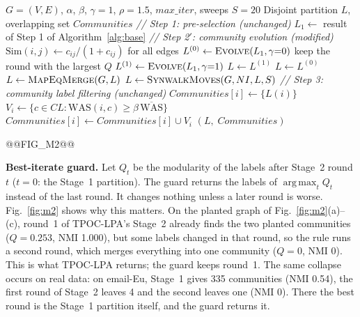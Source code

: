 \documentclass[conference]{IEEEtran}
\newcommand{\algcomment}[1]{\Statex \textit{// #1}}
\DeclareMathOperator*{\argmax}{arg\,max}
\begin{document}
\begin{algorithm}[t]
\footnotesize
\caption{Proposed pipeline (SN-LPA)}\label{alg:ours}
\begin{algorithmic}[1]
\Require $G=(V,E)$, $\alpha$, $\beta$, $\gamma{=}1$, $\rho{=}1.5$, $max\_iter$, sweeps $S{=}20$
\Ensure Disjoint partition $L$, overlapping set $Communities$
\algcomment{Step 1: pre-selection (unchanged)}
\State $L_1\gets$ result of Step 1 of Algorithm~\ref{alg:base}
\algcomment{Step 2$'$: community evolution (modified)}
\State $\mathrm{Sim}(i,j)\gets c_{ij}/(1+c_{ij})$ for all edges 
\State $L^{(0)}\gets\textsc{Evolve}(L_1,\gamma{=}0)$ 
\State \hspace{\algorithmicindent}keep the round with the largest $Q$ 
\State $L^{(1)}\gets\textsc{Evolve}(L_1,\gamma{=}1)$ 
 
  \State $L\gets L^{(1)}$
\Else
  \State $L\gets L^{(0)}$
\EndIf
\State $L\gets\textsc{MapEqMerge}(G,L)$ 
\State $L\gets\textsc{SynwalkMoves}(G,NI,L,S)$ 
\algcomment{Step 3: community label filtering (unchanged)}
 $Communities[i]\gets\{L(i)\}$ \EndFor
{}
  \State $V_i\gets\{c\in CL:\mathrm{WAS}(i,c)\ge\beta\,\overline{\mathrm{WAS}}\}$
  \State $Communities[i]\gets Communities[i]\cup V_i$
\EndFor
\State \Return $(L,\;Communities)$
\end{algorithmic}
\end{algorithm}

@@FIG_M2@@

\textbf{Best-iterate guard.} Let $Q_t$ be the modularity of the labels after Stage~2 round $t$ ($t=0$: the Stage~1 partition). The guard returns the labels of $\argmax_tQ_t$ instead of the last round. It changes nothing unless a later round is worse. Fig.~\ref{fig:m2} shows why this matters. On the planted graph of Fig.~\ref{fig:m2}(a)--(c), round~1 of TPOC-LPA's Stage~2 already finds the two planted communities ($Q=0.253$, NMI 1.000), but some labels changed in that round, so the rule runs a second round, which merges everything into one community ($Q=0$, NMI 0). This is what TPOC-LPA returns; the guard keeps round~1. The same collapse occurs on real data: on email-Eu, Stage~1 gives 335 communities (NMI 0.54), the first round of Stage~2 leaves 4 and the second leaves one (NMI 0). There the best round is the Stage~1 partition itself, and the guard returns it.
\end{document}
